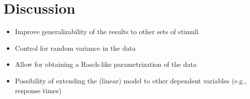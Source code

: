\documentclass[compress]{beamer}
\begin{document}
\section{Discussion}

\begin{frame}
	\begin{itemize}
	\item Improve generalizability of the results to other sets of stimuli 

\item Control for random variance in the data 

\item Allow for obtaining a Rasch-like parametrization of the data 

\item Possibility of extending the (linear) model to other dependent variables (e.g., response times)
		
	\end{itemize}
\end{frame}
\end{document}
